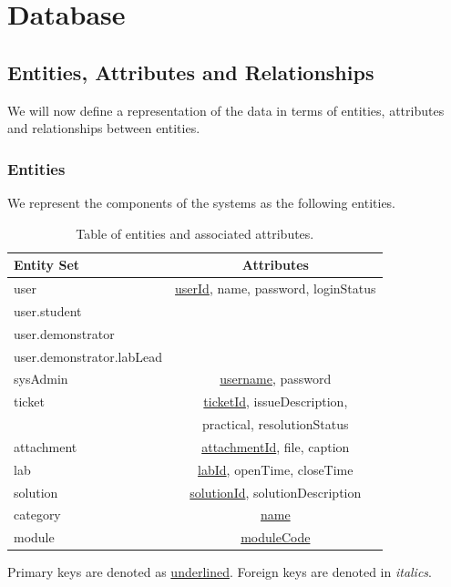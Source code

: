 \section{Database}

\subsection{Entities, Attributes and Relationships}
We will now define a representation of the data in terms of entities, attributes and relationships between entities.

\subsubsection{Entities}

We represent the components of the systems as the following entities. 

\FloatBarrier
\begin{table}[H]
\centering
\begin{tabular}{ |l|c| } 
 \hline
 \textbf{Entity Set} & \textbf{Attributes}\\ 
 \hline
  user & \underline{userId}, name, password, loginStatus\\ 
 \hspace{6pt}user.student & \\ 
 \hspace{6pt}user.demonstrator & \\
 \hspace{12pt}user.demonstrator.labLead & \\
 sysAdmin & \underline{username}, password\\ 
 ticket & \underline{ticketId}, issueDescription,\\
 & practical, resolutionStatus \\
 attachment & \underline{attachmentId}, file, caption \\
 lab & \underline{labId}, openTime, closeTime\\
 solution & \underline{solutionId}, solutionDescription\\
 category & \underline{name} \\
 module & \underline{moduleCode} \\
 \hline
\end{tabular}
\caption{Table of entities and associated attributes.}
\end{table}
\FloatBarrier

Primary keys are denoted as \underline{underlined}. Foreign keys are denoted in \textit{italics}.

